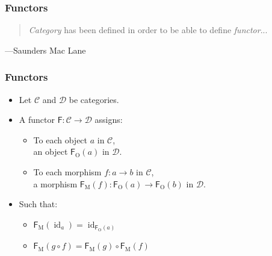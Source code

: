 \documentclass{beamer}
\DeclareMathOperator{\obj}{O}
\DeclareMathOperator{\mor}{M}
\DeclareMathOperator{\id}{id}
\newcommand{\idO}[1]{\natO{\id}{#1}}
\newcommand{\comp}{\ensuremath{\mathrel{\circ}}}
\newcommand{\cat}[1]{\ensuremath{\mathcal{#1}}}
\newcommand{\func}[1]{\ensuremath{\mathsf{#1}}}
\newcommand{\funcO}[1]{\ensuremath{\func{#1}_{\obj}}}
\newcommand{\funcM}[1]{\ensuremath{\func{#1}_{\mor}}}
\newcommand{\nat}[1]{\ensuremath{#1}}
\newcommand{\natO}[2]{\ensuremath{\nat{#1}_{#2}}}
\begin{document}

\begin{frame}
  \frametitle{Functors}

  \begin{quote}
    \emph{Category} has been defined in order to be able to define
    \emph{functor}...
  \end{quote}
  \hfill ---Saunders Mac Lane

\end{frame}


\begin{frame}[label={def:functor}]
  \frametitle{Functors}

  \begin{definition}[Functor]
    \begin{itemize}
    \item
      Let \cat{C} and \cat{D} be categories.
    \item
      A functor $\func{F}: \cat{C} \to \cat{D}$ assigns:
      \begin{itemize}
      \item
        To each object $a$ in \cat{C},\\ an object $\funcO{F}(a)$ in
        \cat{D}.
      \item
        To each morphism $f: a \to b$ in \cat{C},\\ a morphism
        $\funcM{F}(f): \funcO{F}(a) \to \funcO{F}(b)$ in \cat{D}.
      \end{itemize}
    \item
      Such that:
      \begin{itemize}
      \item
        $\funcM{F}(\idO{a}) = \idO{\funcO{F}(a)}$
      \item
        $\funcM{F}(g \comp f) = \funcM{F}(g) \comp \funcM{F}(f)$
      \end{itemize}
    \end{itemize}
  \end{definition}

\end{frame}

\end{document}

